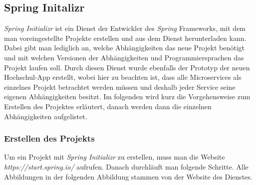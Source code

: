 \subsection*{Spring Initalizr}

\textit{Spring Initializr} ist ein Dienst der Entwickler des \textit{Spring} Frameworks, mit dem man voreingestellte Projekte erstellen und aus dem Dienst herunterladen kann. Dabei gibt man lediglich an, welche Abhängigkeiten das neue Projekt benötigt und mit welchen Versionen der Abhängigkeiten und Programmiersprachen das Projekt laufen soll. Durch diesen Dienst wurde ebenfalls der Prototyp der neuen Hochschul-\ac{App} erstellt, wobei hier zu beachten ist, dass alle Microservices als einzelnes Projekt betrachtet werden müssen und deshalb jeder Service seine eigenen Abhängigkeiten besitzt. Im folgenden wird kurz die Vorgehensweise zum Erstellen des Projektes erläutert, danach werden dann die einzelnen Abhängigkeiten aufgelistet.

\subsubsection*{Erstellen des Projekts}

Um ein Projekt mit \textit{Spring Initializr} zu erstellen, muss man die Website \textit{https://\-start.spring.io/} aufrufen. Danach durchläuft man folgende Schritte. Alle Abbildungen in der folgenden Abbildung stammen von der Website des Dienstes\autocite[][]{initializr}.

